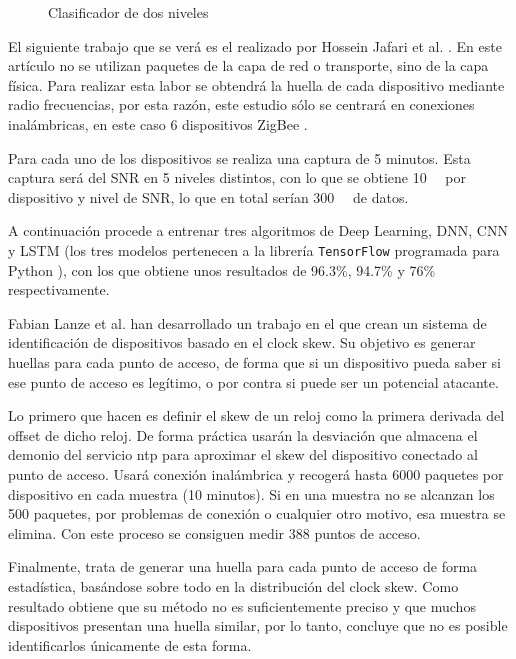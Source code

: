 \begin{figure}[htpb!]
    \centering
    \resizebox{0.7\textwidth}{!}{
        
    }
    \caption{Clasificador de dos niveles \cite{aksoy2019automated}}
    \label{fig:askoy_classifier}
\end{figure}

El siguiente trabajo que se verá es el realizado por Hossein Jafari et al. \cite{jafari2018iot}. En este artículo no se utilizan paquetes de la capa de red o transporte, sino de la capa física. Para realizar esta labor se obtendrá la huella de cada dispositivo mediante radio frecuencias, por esta razón, este estudio sólo se centrará en conexiones inalámbricas, en este caso 6 dispositivos ZigBee \cite{gislason2008zigbee}.

Para cada uno de los dispositivos se realiza una captura de 5 minutos. Esta captura será del SNR en 5 niveles distintos, con lo que se obtiene \SI{10}{\giga\byte} por dispositivo y nivel de SNR, lo que en total serían \SI{300}{\giga\byte} de datos.

A continuación procede a entrenar tres algoritmos de Deep Learning, DNN, CNN y LSTM (los tres modelos pertenecen a la librería \texttt{TensorFlow} programada para Python \cite{tensorflow2015-whitepaper}), con los que obtiene unos resultados de 96.3\%, 94.7\% y 76\% respectivamente.

Fabian Lanze et al. \cite{lanze2012clock} han desarrollado un trabajo en el que crean un sistema de identificación de dispositivos basado en el clock skew. Su objetivo es generar huellas para cada punto de acceso, de forma que si un dispositivo pueda saber si ese punto de acceso es legítimo, o por contra si puede ser un potencial atacante.

Lo primero que hacen es definir el skew de un reloj como la primera derivada del offset de dicho reloj. De forma práctica usarán la desviación que almacena el demonio del servicio \acrshort{ntp} para aproximar el skew del dispositivo conectado al punto de acceso. Usará conexión inalámbrica y recogerá hasta 6000 paquetes por dispositivo en cada muestra (10 minutos). Si en una muestra no se alcanzan los 500 paquetes, por problemas de conexión o cualquier otro motivo, esa muestra se elimina. Con este proceso se consiguen medir 388 puntos de acceso. 

Finalmente, trata de generar una huella para cada punto de acceso de forma estadística, basándose sobre todo en la distribución del clock skew. Como resultado obtiene que su método no es suficientemente preciso y que muchos dispositivos presentan una huella similar, por lo tanto, concluye que no es posible identificarlos únicamente de esta forma.

